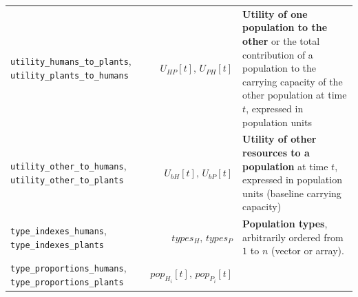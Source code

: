 \documentclass[
]{book}
\begin{document}
\begin{longtable}[]{@{}lrl@{}}
\begin{minipage}[t]{0.36\columnwidth}\raggedright
\texttt{utility\_humans\_to\_plants}, \texttt{utility\_plants\_to\_humans}\strut
\end{minipage} & \begin{minipage}[t]{0.22\columnwidth}\raggedleft
\(U_{HP}[t],\,U_{PH}[t]\)\strut
\end{minipage} & \begin{minipage}[t]{0.34\columnwidth}\raggedright
\textbf{Utility of one population to the other} or the total contribution of a population to the carrying capacity of the other population at time \(t\), expressed in population units\strut
\end{minipage}\tabularnewline
\begin{minipage}[t]{0.36\columnwidth}\raggedright
\texttt{utility\_other\_to\_humans}, \texttt{utility\_other\_to\_plants}\strut
\end{minipage} & \begin{minipage}[t]{0.22\columnwidth}\raggedleft
\(U_{bH}[t],\,U_{bP}[t]\)\strut
\end{minipage} & \begin{minipage}[t]{0.34\columnwidth}\raggedright
\textbf{Utility of other resources to a population} at time \(t\), expressed in population units (baseline carrying capacity)\strut
\end{minipage}\tabularnewline
\begin{minipage}[t]{0.36\columnwidth}\raggedright
\texttt{type\_indexes\_humans}, \texttt{type\_indexes\_plants}\strut
\end{minipage} & \begin{minipage}[t]{0.22\columnwidth}\raggedleft
\(types_{H},\,types_{P}\)\strut
\end{minipage} & \begin{minipage}[t]{0.34\columnwidth}\raggedright
\textbf{Population types}, arbitrarily ordered from \(1\) to \(n\) (vector or array).\strut
\end{minipage}\tabularnewline
\begin{minipage}[t]{0.36\columnwidth}\raggedright
\texttt{type\_proportions\_humans}, \texttt{type\_proportions\_plants}\strut
\end{minipage} & \begin{minipage}[t]{0.22\columnwidth}\raggedleft
\(pop_{H_{i}}[t],\,pop_{P_{i}}[t]\)\strut
\end{minipage} & \begin{minipage}[t]{0.34\columnwidth}\raggedright

\end{minipage}
\end{longtable}
\end{document}
